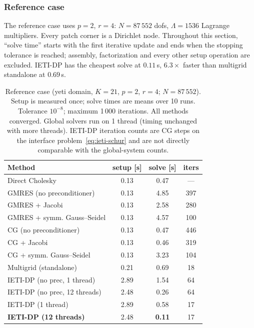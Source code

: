 \documentclass{article}
\newcommand{\npatch}{K} %
\theoremstyle{plain}
\numberwithin{equation}{section}
\begin{document}
\subsubsection{Reference case} \label{subsubsec:bench-2d-reference}

The reference case uses $p = 2$, $r = 4$: $N = 87\,552$ dofs, $\Lambda = 1536$
Lagrange multipliers. Every patch corner is a Dirichlet node.  Throughout this
section, ``solve time'' starts with the first iterative update and ends when the
stopping tolerance is reached; assembly, factorization and every other setup
operation are excluded.  IETI-DP has the cheapest solve at $0.11\,$s, $6.3\times$
faster than multigrid standalone at $0.69\,$s.

\begin{table}[t]
    \centering
    \caption{Reference case (yeti domain, $\npatch = 21$, $p = 2$, $r = 4$;
        $N = 87\,552$). Setup is measured once; solve times are means over 10 runs.
        Tolerance $10^{-8}$; maximum 1\,000 iterations. All methods converged.
        Global solvers run on 1 thread (timing unchanged with more threads).
        IETI-DP iteration counts are CG steps on the interface
        problem~\eqref{eq:ieti-schur} and are not directly comparable with the
        global-system counts.}
    \label{tab:yeti-reference}
    \begin{tabular}{lccc}
        \toprule
        Method                        & setup [s] & solve [s]     & iters \\
        \midrule
        Direct Cholesky               & 0.13      & 0.47          & ---   \\
        GMRES (no preconditioner)     & 0.13      & 4.85          & 397   \\
        GMRES + Jacobi                & 0.13      & 2.58          & 280   \\
        GMRES + symm. Gauss--Seidel   & 0.13      & 4.57          & 100   \\
        CG (no preconditioner)        & 0.13      & 0.47          & 446   \\
        CG + Jacobi                   & 0.13      & 0.46          & 319   \\
        CG + symm. Gauss--Seidel      & 0.13      & 3.23          & 104   \\
        Multigrid (standalone)        & 0.21      & 0.69          & 18    \\
        IETI-DP (no prec, 1 thread)   & 2.89      & 1.54          & 64    \\
        IETI-DP (no prec, 12 threads) & 2.48      & 0.26          & 64    \\
        IETI-DP (1 thread)            & 2.89      & 0.58          & 17    \\
        \textbf{IETI-DP (12 threads)} & 2.48      & \textbf{0.11} & 17    \\
        \bottomrule
    \end{tabular}
\end{table}
\end{document}
